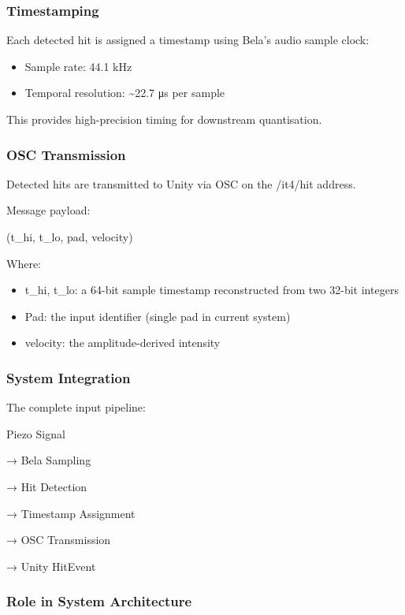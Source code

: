 \subsubsection{Timestamping}\label{timestamping}

Each detected hit is assigned a timestamp using Bela's audio sample
clock:

\begin{itemize}
\item
  Sample rate: 44.1 kHz
\item
  Temporal resolution: \textasciitilde22.7 μs per sample
\end{itemize}

This provides high-precision timing for downstream quantisation.

\subsubsection{OSC Transmission}\label{osc-transmission}

Detected hits are transmitted to Unity via OSC on the /it4/hit address.

Message payload:

(t\_hi, t\_lo, pad, velocity)

Where:

\begin{itemize}
\item
  t\_hi, t\_lo: a 64-bit sample timestamp reconstructed from two 32-bit
  integers
\item
  Pad: the input identifier (single pad in current system)
\item
  velocity: the amplitude-derived intensity
\end{itemize}

\subsubsection{System Integration}\label{system-integration}

The complete input pipeline:

Piezo Signal

→ Bela Sampling

→ Hit Detection

→ Timestamp Assignment

→ OSC Transmission

→ Unity HitEvent

\subsubsection{Role in System
Architecture}\label{role-in-system-architecture}

